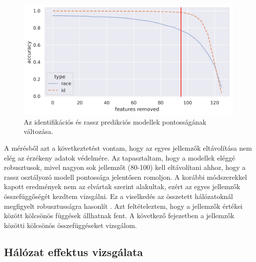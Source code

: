 \begin{figure}[ht]
	\centering
	\includegraphics[width=0.9\columnwidth]{figures/imp_race_id_graph.png}
	\caption{Az identifikációs és rassz predikciós modellek pontosságának változása.}
	\label{fig:retrain}
\end{figure}

A mérésből azt a következtetést vontam, hogy az egyes jellemzők eltávolítása nem elég az érzékeny adatok védelmére. Az tapasztaltam, hogy a modellek eléggé robusztusok, mivel nagyon sok jellemzőt (80-100) kell eltávolítani ahhoz, hogy a rassz osztályozó modell pontossága jelentősen romoljon. A korábbi módszerekkel kapott eredmények nem az elvártak szerint alakultak, ezért az egyes jellemzők összefüggőségét kezdtem vizsgálni. Ez a viselkedés az összetett hálózatoknál megfigyelt robusztusságra hasonlít \cite{albert2000error}. Azt feltételeztem, hogy a jellemzők értékei között kölcsönös függések állhatnak fent. A következő fejezetben a jellemzők közötti kölcsönös összefüggéseket vizsgálom.

% 


\subsection{Hálózat effektus vizsgálata}

